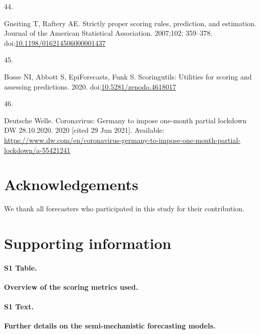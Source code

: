 \documentclass[10pt,letterpaper]{article}
\renewcommand{\figurename}{Fig}
\newlength{\cslhangindent}
\newlength{\csllabelwidth}
\newlength{\cslentryspacingunit} %
\newenvironment{CSLReferences}[2] %
 {%
  \setlength{\parindent}{0pt}
  \ifodd #1
  \let\oldpar\par
  \def\par{\hangindent=\cslhangindent\oldpar}
  \fi
  \setlength{\parskip}{#2\cslentryspacingunit}
 }%
 {}
\newcommand{\CSLLeftMargin}[1]{\parbox[t]{\csllabelwidth}{#1}}
\newcommand{\CSLRightInline}[1]{\parbox[t]{\linewidth - \csllabelwidth}{#1}\break}
\newcommand{\beginsupplement}{\setcounter{table}{0}  \renewcommand{\thetable}{S\arabic{table}}
\newfloat{text}{thp}{}
\floatname{text}{Text}
\renewcommand{\figurename}{}
\newcommand{\newfigurename}{Hello}
\setcounter{figure}{0} \renewcommand{\thefigure}{S\arabic{figure}}}
\begin{document}
\begin{CSLReferences}{0}{0}
\leavevmode{}%
\CSLLeftMargin{44. }%
\CSLRightInline{Gneiting T, Raftery AE. Strictly proper scoring rules,
prediction, and estimation. Journal of the American Statistical
Association. 2007;102: 359--378.
doi:\href{https://doi.org/10.1198/016214506000001437}{10.1198/016214506000001437}}

\leavevmode{}%
\CSLLeftMargin{45. }%
\CSLRightInline{Bosse NI, Abbott S, EpiForecasts, Funk S. Scoringutils:
Utilities for scoring and assessing predictions. 2020.
doi:\href{https://doi.org/10.5281/zenodo.4618017}{10.5281/zenodo.4618017}}

\leavevmode{}%
\CSLLeftMargin{46. }%
\CSLRightInline{Deutsche Welle. Coronavirus: {Germany} to impose
one-month partial lockdown \textbar{} {DW} \textbar{} 28.10.2020. 2020
{[}cited 29 Jun 2021{]}. Available:
\url{https://www.dw.com/en/coronavirus-germany-to-impose-one-month-partial-lockdown/a-55421241}}

\end{CSLReferences}

\clearpage

\section*{Acknowledgements}

We thank all forecasters who participated in this study for their
contribution.

\clearpage

\beginsupplement

\section*{Supporting information}

\paragraph*{S1 Table.}
\label{tab:scoring-metrics}

\textbf{Overview of the scoring metrics used.}

\paragraph*{S1 Text.}
\label{txt:details-models}

\textbf{Further details on the semi-mechanistic forecasting models.}
\end{document}

